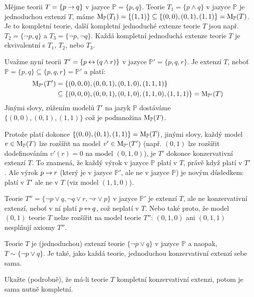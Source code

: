\begin{example}
Mějme teorii $T=\{p\mathbin{\rightarrow} q\}$ v jazyce $\mathbb P=\{p,q\}$. Teorie $T_1=\{p\land q\}$ v jazyce $\mathbb P$ je jednoduchou extenzí $T$, máme $\operatorname{M}_\mathbb P(T_1)=\{(1,1)\}\subseteq\{(0,0),(0,1),(1,1)\}=\operatorname{M}_\mathbb P(T)$. Je to kompletní teorie, další kompletní jednoduché extenze teorie $T$ jsou např.\ $T_2=\{\neg p,q\}$ a $T_3=\{\neg p,\neg q\}$. Každá kompletní jednoduchá extenze teorie $T$ je ekvivalentní s $T_1$, $T_2$, nebo $T_3$.

Uvažme nyní teorii $T'=\{p\mathbin{\leftrightarrow} (q\land r)\}$ v jazyce $\mathbb P'=\{p,q,r\}$. Je extenzí $T$, neboť $\mathbb P=\{p,q\}\subseteq\{p,q,r\}=\mathbb P'$ a platí:
\begin{align*}
    \operatorname{M}_{\mathbb P'}(T')&=\{(0,0,0),(0,0,1),(0,1,0),(1,1,1)\}\\ 
    &\subseteq\{(0,0,0),(0,0,1),(0,1,0),(1,1,0),(1,1,1)\}=\operatorname{M}_{\mathbb P'}(T)     
\end{align*}
Jinými slovy, zúžením modelů $T'$ na jazyk $\mathbb P$ dostáváme $\{(0,0),(0,1),(1,1)\}$ což je podmnožina $\operatorname{M}_\mathbb P(T)$. 

Protože platí dokonce $\{(0,0),(0,1),(1,1)\}=\operatorname{M}_\mathbb P(T)$, jinými slovy, každý model $v\in\operatorname{M}_\mathbb P(T)$ lze rozšířit na model $v'\in\operatorname{M}_{\mathbb P'}(T')$ (např. $(0,1)$ lze rozšířit dodefinováním $v'(r)=0$ na model $(0,1,0)$), je $T'$ dokonce konzervativní extenzí $T$. To znamená, že každý výrok v jazyce $\mathbb P$ platí v $T$, právě když platí v $T'$. Ale výrok $p\mathbin{\rightarrow} r$ (který je v jazyce $\mathbb P'$, ale ne v jazyce $\mathbb P$) je novým důsledkem: platí v $T'$ ale ne v $T$ (viz model $(1,1,0)$).

Teorie $T''=\{\neg p\lor q,\neg q\lor r,\neg r\lor p\}$ v jazyce $\mathbb P'$ je extenzí $T$, ale ne konzervativní extenzí, neboť v ní platí $p\mathbin{\leftrightarrow} q$, což neplatí v $T$. Nebo také proto, že model $(0, 1)$ teorie $T$ nelze rozšířit na model teorie $T''$: $(0,1,0)$ ani $(0,1,1)$ nesplňují axiomy $T''$.

Teorie $T$ je (jednoduchou) extenzí teorie $\{\neg p\lor q\}$ v jazyce $\mathbb P$ a naopak, $T\sim\{\neg p\lor q\}$. Je také, jako každá teorie, jednoduchou konzervativní extenzí sebe sama.
\end{example}

\begin{exercise}
    Ukažte (podrobně), že má-li teorie $T$ kompletní konzervativní extenzi, potom je sama nutně kompletní.
\end{exercise}

